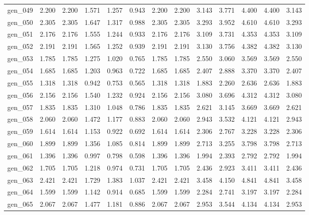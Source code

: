 \begin{tabular}{lrrrrrrrrrrrr}
gen\_049 &  2.200 &  2.200 &  1.571 &  1.257 &  0.943 &  2.200 &  2.200 &  3.143 &  3.771 &  4.400 &  4.400 &  3.143 \\
gen\_050 &  2.305 &  2.305 &  1.647 &  1.317 &  0.988 &  2.305 &  2.305 &  3.293 &  3.952 &  4.610 &  4.610 &  3.293 \\
gen\_051 &  2.176 &  2.176 &  1.555 &  1.244 &  0.933 &  2.176 &  2.176 &  3.109 &  3.731 &  4.353 &  4.353 &  3.109 \\
gen\_052 &  2.191 &  2.191 &  1.565 &  1.252 &  0.939 &  2.191 &  2.191 &  3.130 &  3.756 &  4.382 &  4.382 &  3.130 \\
gen\_053 &  1.785 &  1.785 &  1.275 &  1.020 &  0.765 &  1.785 &  1.785 &  2.550 &  3.060 &  3.569 &  3.569 &  2.550 \\
gen\_054 &  1.685 &  1.685 &  1.203 &  0.963 &  0.722 &  1.685 &  1.685 &  2.407 &  2.888 &  3.370 &  3.370 &  2.407 \\
gen\_055 &  1.318 &  1.318 &  0.942 &  0.753 &  0.565 &  1.318 &  1.318 &  1.883 &  2.260 &  2.636 &  2.636 &  1.883 \\
gen\_056 &  2.156 &  2.156 &  1.540 &  1.232 &  0.924 &  2.156 &  2.156 &  3.080 &  3.696 &  4.312 &  4.312 &  3.080 \\
gen\_057 &  1.835 &  1.835 &  1.310 &  1.048 &  0.786 &  1.835 &  1.835 &  2.621 &  3.145 &  3.669 &  3.669 &  2.621 \\
gen\_058 &  2.060 &  2.060 &  1.472 &  1.177 &  0.883 &  2.060 &  2.060 &  2.943 &  3.532 &  4.121 &  4.121 &  2.943 \\
gen\_059 &  1.614 &  1.614 &  1.153 &  0.922 &  0.692 &  1.614 &  1.614 &  2.306 &  2.767 &  3.228 &  3.228 &  2.306 \\
gen\_060 &  1.899 &  1.899 &  1.356 &  1.085 &  0.814 &  1.899 &  1.899 &  2.713 &  3.255 &  3.798 &  3.798 &  2.713 \\
gen\_061 &  1.396 &  1.396 &  0.997 &  0.798 &  0.598 &  1.396 &  1.396 &  1.994 &  2.393 &  2.792 &  2.792 &  1.994 \\
gen\_062 &  1.705 &  1.705 &  1.218 &  0.974 &  0.731 &  1.705 &  1.705 &  2.436 &  2.923 &  3.411 &  3.411 &  2.436 \\
gen\_063 &  2.421 &  2.421 &  1.729 &  1.383 &  1.037 &  2.421 &  2.421 &  3.458 &  4.150 &  4.841 &  4.841 &  3.458 \\
gen\_064 &  1.599 &  1.599 &  1.142 &  0.914 &  0.685 &  1.599 &  1.599 &  2.284 &  2.741 &  3.197 &  3.197 &  2.284 \\
gen\_065 &  2.067 &  2.067 &  1.477 &  1.181 &  0.886 &  2.067 &  2.067 &  2.953 &  3.544 &  4.134 &  4.134 &  2.953 \\

\end{tabular}
